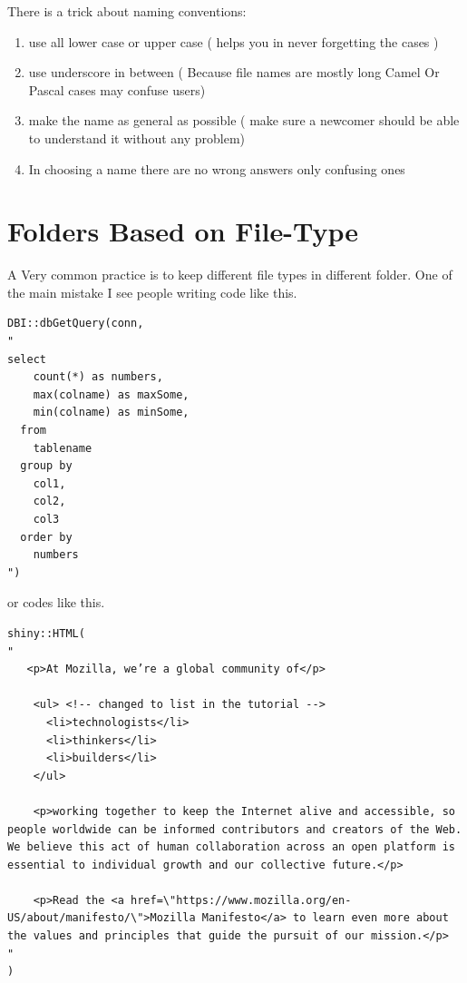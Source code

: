 \documentclass[
]{book}
\providecommand{\tightlist}{%
  \setlength{\itemsep}{0pt}\setlength{\parskip}{0pt}}
\begin{document}
There is a trick about naming conventions:

\begin{enumerate}
\def\labelenumi{\arabic{enumi}.}
\tightlist
\item
  use all lower case or upper case ( helps you in never forgetting the cases )
\item
  use underscore in between ( Because file names are mostly long Camel Or Pascal cases may confuse users)
\item
  make the name as general as possible ( make sure a newcomer should be able to understand it without any problem)
\item
  In choosing a name there are no wrong answers only confusing ones
\end{enumerate}

\hypertarget{folders-based-on-file-type}{%
\section{Folders Based on File-Type}\label{folders-based-on-file-type}}

A Very common practice is to keep different file types in different folder. One of the main mistake I see people writing code like this.

\begin{verbatim}
DBI::dbGetQuery(conn,
"
select 
    count(*) as numbers,
    max(colname) as maxSome,
    min(colname) as minSome,
  from
    tablename
  group by
    col1,
    col2,
    col3
  order by 
    numbers
")
\end{verbatim}

or codes like this.

\begin{verbatim}
shiny::HTML(
"
   <p>At Mozilla, we’re a global community of</p>

    <ul> <!-- changed to list in the tutorial -->
      <li>technologists</li>
      <li>thinkers</li>
      <li>builders</li>
    </ul>

    <p>working together to keep the Internet alive and accessible, so people worldwide can be informed contributors and creators of the Web. We believe this act of human collaboration across an open platform is essential to individual growth and our collective future.</p>

    <p>Read the <a href=\"https://www.mozilla.org/en-US/about/manifesto/\">Mozilla Manifesto</a> to learn even more about the values and principles that guide the pursuit of our mission.</p>
"
)
\end{verbatim}
\end{document}
